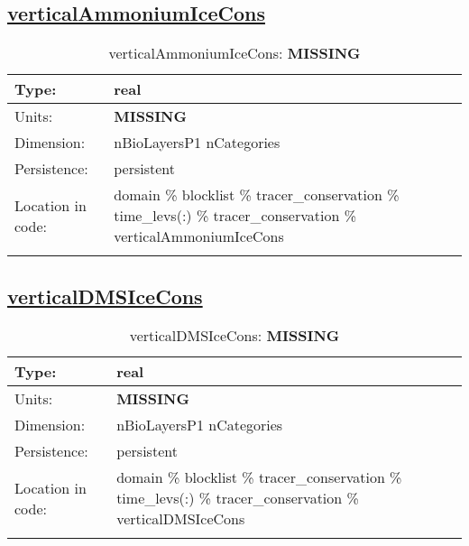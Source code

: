 \subsection[verticalAmmoniumIceCons]{\hyperref[sec:var_tab_tracer_conservation]{verticalAmmoniumIceCons}}
\label{subsec:var_sec_tracer_conservation_verticalAmmoniumIceCons}
\begin{center}
\begin{longtable}{| p{2.0in} | p{4.0in} |}
        \hline 
        Type: & real \\
        \hline 
        Units: & {\bf \color{red} MISSING} \\
        \hline 
        Dimension: & nBioLayersP1 nCategories \\
        \hline 
        Persistence: & persistent \\
        \hline 
         Location in code: & domain \% blocklist \% tracer\_conservation \% time\_levs(:) \% tracer\_conservation \% verticalAmmoniumIceCons \\
         \hline 
    \caption{verticalAmmoniumIceCons: {\bf \color{red} MISSING}}
\end{longtable}
\end{center}
\subsection[verticalDMSIceCons]{\hyperref[sec:var_tab_tracer_conservation]{verticalDMSIceCons}}
\label{subsec:var_sec_tracer_conservation_verticalDMSIceCons}
\begin{center}
\begin{longtable}{| p{2.0in} | p{4.0in} |}
        \hline 
        Type: & real \\
        \hline 
        Units: & {\bf \color{red} MISSING} \\
        \hline 
        Dimension: & nBioLayersP1 nCategories \\
        \hline 
        Persistence: & persistent \\
        \hline 
         Location in code: & domain \% blocklist \% tracer\_conservation \% time\_levs(:) \% tracer\_conservation \% verticalDMSIceCons \\
         \hline 
    \caption{verticalDMSIceCons: {\bf \color{red} MISSING}}
\end{longtable}
\end{center}
